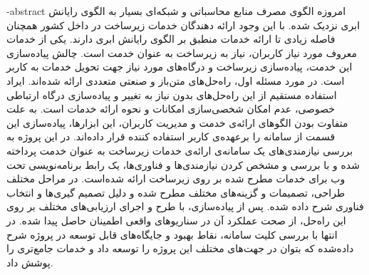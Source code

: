 
\department{}

\fa-abstract{
امروزه الگوی مصرف منابع محاسباتی و شبکه‌ای بسیار به الگوی رایانش ابری نزدیک شده. با این وجود ارائه دهندگان خدمات زیرساخت در داخل کشور همچنان فاصله زیادی تا ارائه خدمات منطبق بر الگوی رایانش ابری دارند. یکی از خدمات معروف مورد نیاز کاربران، نیاز به زیرساخت به عنوان خدمت است. چالش پیاده‌سازی این خدمت، پیاده‌سازی زیرساخت و درگاه‌های مورد نیاز جهت تحویل خدمات به کاربر است. در مورد مسئله اول، راه‌حل‌های متن‌باز و صنعتی متعددی ارائه شده‌اند. ایراد استفاده مستقیم از این راه‌حل‌های بدون نیاز به تغییر و پیاده‌سازی درگاه ارتباطی خصوصی، عدم امکان شخصی‌سازی امکانات و نحوه ارائه خدمات است. به علت متفاوت بودن الگو‌های ارائه‌ی خدمت و مدیریت کاربران، این ابزار‌ها، پیاده‌سازی این قسمت از سامانه‌ را برعهده‌ی ‌کاربر استفاده کننده قرار داده‌اند. در این پروژه به بررسی نیازمندی‌های یک سامانه‌ی ارائه‌ی خدمات زیرساخت به عنوان خدمت پرداخته شده و با بررسی و مشخص کردن نیازمندی‌ها و فناوری‌ها، یک رابط برنامه‌نویسی تحت وب برای خدمات مطرح شده بر روی زیرساخت  ارائه شده‌است. در مراحل مختلف طراحی، تصمیمات و گزینه‌های مختلف مطرح شده و دلیل تصمیم گیری‌ها و انتخاب فناوری شرح داده شده. پس از پیاده‌سازی، با طرح و اجرای ارزیابی‌های مختلف بر روی این راه‌حل، از صحت عملکرد آن در سناریو‌های واقعی اطمینان حاصل پیدا شده. در انتها با بررسی کلیت سامانه، نقاط بهبود و جایگاه‌های قابل توسعه در پروژه شرح داده‌شده که بتوان در جهت‌های مختلف این پروژه را توسعه داد و خدمات جامع‌تری را پوشش داد.
}

